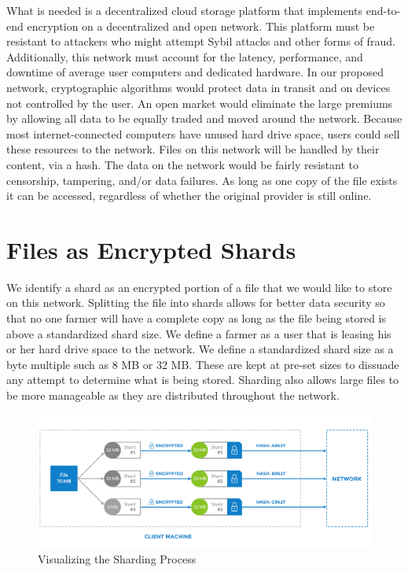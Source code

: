 \documentclass[a4paper,10pt]{article}
\begin{document}
What is needed is a decentralized cloud storage platform that implements end-to-end encryption on a decentralized and open network. This platform must be resistant to attackers who might attempt Sybil attacks and other forms of fraud. Additionally, this network must account for the latency, performance, and downtime of average user computers and dedicated hardware. In our proposed network, cryptographic algorithms would protect data in transit and on devices not controlled by the user. An open market would eliminate the large premiums by allowing all data to be equally traded and moved around the network. Because most internet-connected computers have unused hard drive space, users could sell these resources to the network. Files on this network will be handled by their content, via a hash. The data on the network would be fairly resistant to censorship, tampering, and/or data failures. As long as one copy of the file exists it can be accessed, regardless of whether the original provider is still online.\\

\section{Files as Encrypted Shards}
We identify a shard as an encrypted portion of a file that we would like to store on this network. Splitting the file into shards allows for better data security so that no one farmer will have a complete copy as long as the file being stored is above a standardized shard size. We define a farmer as a user that is leasing his or her hard drive space to the network. We define a standardized shard size as a byte multiple such as 8 MB or 32 MB. These are kept at pre-set sizes to dissuade any attempt to determine what is being stored. Sharding also allows large files to be more manageable as they are distributed throughout the network. 
\\
\begin{figure}[h!]
\centering
\includegraphics[width=\linewidth]{1}
\caption{Visualizing the Sharding Process}
\end{figure}
\end{document}
